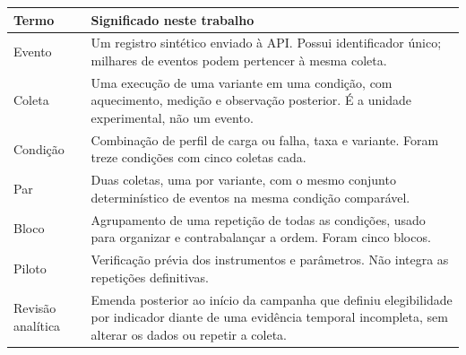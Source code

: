 \begin{quadro}[htbp]
\centering\small
\caption{Termos da organização experimental}\label{qua:termos}
\begin{tabular}{|p{}|p{}|}
\hline
Termo & Significado neste trabalho\\ \hline
Evento & Um registro sintético enviado à API. Possui identificador único; milhares de eventos podem pertencer à mesma coleta.\\ \hline
Coleta & Uma execução de uma variante em uma condição, com aquecimento, medição e observação posterior. É a unidade experimental, não um evento.\\ \hline
Condição & Combinação de perfil de carga ou falha, taxa e variante. Foram treze condições com cinco coletas cada.\\ \hline
Par & Duas coletas, uma por variante, com o mesmo conjunto determinístico de eventos na mesma condição comparável.\\ \hline
Bloco & Agrupamento de uma repetição de todas as condições, usado para organizar e contrabalançar a ordem. Foram cinco blocos.\\ \hline
Piloto & Verificação prévia dos instrumentos e parâmetros. Não integra as repetições definitivas.\\ \hline
Revisão analítica & Emenda posterior ao início da campanha que definiu elegibilidade por indicador diante de uma evidência temporal incompleta, sem alterar os dados ou repetir a coleta.\\ \hline
\end{tabular}
\end{quadro}
